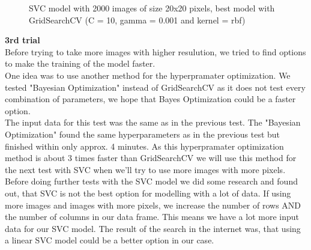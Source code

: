 \documentclass{article}
\begin{document}
\begin{figure}[!ht]
  \centering
  \qquad
  \caption{SVC model with 2000 images of size 20x20 pixels, best model with GridSearchCV (C = 10,  gamma = 0.001 and kernel = rbf)}
  \label{fig:SVC_2000_20x20_grid}
\end{figure}



\textbf{3rd trial }\\
Before trying to take more images with higher resulution, we tried to find options to make the training of the model faster.\\
One idea was to use another method for the hyperpramater optimization. We tested "Bayesian Optimization" instead of GridSearchCV as it does not test every 
combination of parameters, we hope that Bayes Optimization could be a faster option.\\
The input data for this test was the same as in the previous test. The "Bayesian Optimization" found the same hyperparameters as in the previous test but finished 
within only approx. 4 minutes. As this hyperpramater optimization method is about 3 times faster than GridSearchCV we will use this method for the next test with SVC 
when we'll try to use more images with more pixels. \\
Before doing further tests with the SVC model we did some research and found out, that SVC is not the best option for modelling with a lot of data. 
If using more images and images with more pixels, we increase the number of rows AND the number of columns in our data frame. This means we have a lot more input
data for our SVC model. The result of the search in the internet was, that using a linear SVC model could be a better option in our case. 
\end{document}

